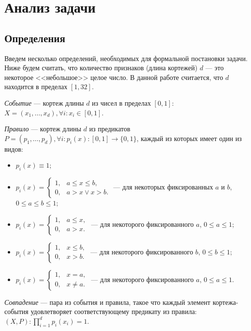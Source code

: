 \documentclass[14pt]{article}
\begin{document}
\section{Анализ задачи}
\subsection{Определения}
Введем несколько определений, необходимых для формальной постановки задачи.
Ниже будем считать, что количество признаков (длина кортежей) $d$ --- это некоторое <<небольшое>> целое число.
В данной работе считается, что $d$ находится в пределах $[1, 32]$.

\emph{Событие} --- кортеж длины $d$ из чисел в пределах $[0, 1]$: $X = (x_1,\ldots,x_d), \forall i: x_i \in [0, 1]$.

\emph{Правило} --- кортеж длины $d$ из предикатов $P = (p_1,\ldots,p_d), \forall i: p_i(x): [0, 1] \rightarrow \{0, 1\}$, каждый из которых имеет один из видов:
\begin{itemize}
    \item $p_i(x) \equiv 1$;
    \item $ p_i(x) =
        \begin{cases}
        1, & a \leq x \leq b, \\
        0, & a > x \vee x > b.
        \end{cases}
    $ --- для некоторых фиксированных $a$ и $b$, $0 \leq a \leq b \leq 1$;
    \item $ p_i(x) =
        \begin{cases}
        1, & a \leq x, \\
        0, & a > x.
        \end{cases}
    $ --- для некоторого фиксированного $a$, $0 \leq a \leq 1$;
    \item $ p_i(x) =
        \begin{cases}
        1, & x \leq b, \\
        0, & x > b.
        \end{cases}
    $ --- для некоторого фиксированного $b$, $0 \leq b \leq 1$;
    \item $ p_i(x) =
        \begin{cases}
        1, & x = a, \\
        0, & x \neq a.
        \end{cases}
    $ --- для некоторого фиксированного $a$, $0 \leq a \leq 1$.
\end{itemize}

\emph{Совпадение} --- пара из события и правила, такое что каждый элемент кортежа-события удовлетворяет соответствующему предикату из правила: $(X, P): \prod_{i=1}^d p_i(x_i) = 1$.
\end{document}
